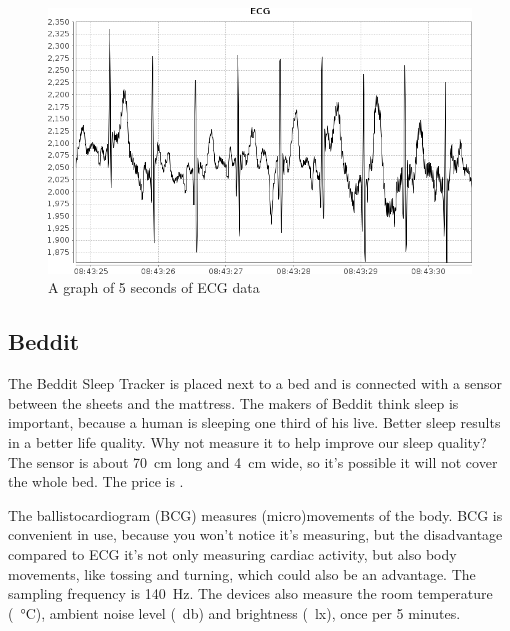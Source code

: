 			\begin{figure}[h]
				\centering
					\includegraphics[scale=0.5]{ecg.png}
					
				\caption{A graph of 5 seconds of ECG data}
				\label{fig:ecg}

			\end{figure}
			


	\subsection{Beddit}
		The Beddit Sleep Tracker is placed next to a bed and is connected with a sensor between the sheets and the mattress. The makers of Beddit think sleep is important, because a human is sleeping one third of his live. Better sleep results in a better life quality. Why not measure it to help improve our sleep quality? The sensor is about \SI{70}{\centi\metre} long and \SI{4}{\centi\metre} wide, so it's possible it will not cover the whole bed. 
			The price is .

			The ballistocardiogram (BCG) measures (micro)movements of the body.\cite{beddit}
			BCG is convenient in use, because you won't notice it's measuring, but the disadvantage compared to ECG it's not only measuring cardiac activity, but also body movements, like tossing and turning, which could also be an advantage.\cite{bcg} The sampling frequency is \SI{140}{\hertz}. The devices also measure the room temperature (\SI{}{\celsius}), ambient noise level (\SI{}{\decibel}) and brightness (\SI{}{\lux}), once per 5 minutes\cite{bedditapi}.

